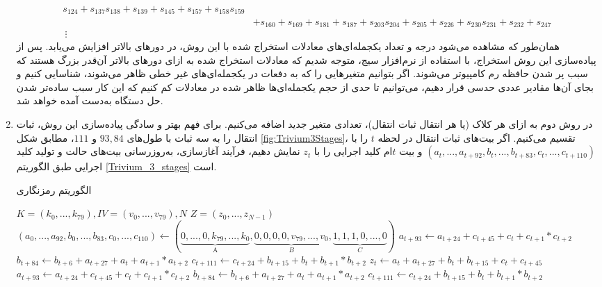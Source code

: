 \begin{enumerate}
\begin{align*}
	s_{124} + s_{137} s_{138} + s_{139} + s_{145} + s_{157} + s_{158}
	s_{159}\\
	&+ s_{160} + s_{169} + s_{181} + s_{187} + s_{203} s_{204} + s_{205} + s_{226} + s_{230} s_{231} + s_{232} + s_{247}\\
	\ \vdots
	\end{align*}
	همان‌طور که مشاهده می‌شود درجه و تعداد یکجمله‌ای‌های معادلات استخراج شده  با این روش، در دورهای بالاتر افزایش می‌یابد. پس از پیاده‌سازی این روش استخراج، با استفاده از نرم‌افزار سیج، متوجه شدیم که معادلات استخراج شده به ازای دورهای بالاتر آن‌قدر بزرگ هستند که سبب پر شدن حافظه رم کامپیوتر می‌شوند. اگر بتوانیم متغیرهایی را که  به دفعات  در یکجمله‌ای‌های غیر خطی ظاهر می‌شوند،  شناسایی کنیم و بجای آن‌ها مقادیر عددی حدسی قرار دهیم، می‌توانیم تا حدی از حجم یکجمله‌ای‌ها ظاهر شده در معادلات کم کنیم که این کار سبب ساده‌تر شدن حل دستگاه به‌دست آمده خواهد شد. 
	
	\item 
	در روش دوم به ازای هر کلاک (یا هر انتقال ثبات انتقال)، تعدادی متغیر جدید اضافه می‌کنیم. برای فهم بهتر و سادگی پیاده‌سازی این روش، ثبات انتقال 
	را به سه ثبات با طول‌های 
	$93, 84$
	و 
	$111$، 
	مطابق شکل 
	\ref{fig:Trivium3Stages}، 
	تقسیم می‌کنیم.  اگر بیت‌های ثبات انتقال در لحظه 
	$t$
	را با  
	$(a_{t},...,a_{t + 92}, b_{t},...,b_{t + 83}, c_{t},..., c_{t + 110})$
	و بیت 
	$t$ام
	کلید اجرایی را با 
	$z_{t}$
	نمایش دهیم، فرآیند آغازسازی، به‌روزرسانی بیت‌های حالت و تولید کلید اجرایی طبق  الگوریتم 
	\ref{Trivium_3_stages}  
	است.
\begin{algorithm}
\caption{الگوریتم رمزنگاری 
		}
\label{Trivium_3_stages}	
	\begin{latin}
		\begin{algorithmic}[]
				
			\REQUIRE  $K = (k_{0},...,k_{79}), IV = (v_{0},...,v_{79}), N$
			\ENSURE $Z = (z_{0},...,z_{N - 1})$
			\STATE $(a_{0},...,a_{92},b_{0},...,b_{83},c_{0},...,c_{110})\gets (\underbrace{0,...,0, k_{79},...,k_{0}}_\text{A},\underbrace{0,0,0,0,v_{79},...,v_{0}}_{B},\underbrace{1,1,1,0,...,0}_{C})$
			\STATE $a_{t + 93} \gets a_{t + 24} + c_{t + 45} + c_{t} + c_{t + 1}*c_{t + 2}$
			\STATE $b_{t + 84} \gets b_{t + 6} + a_{t + 27} + a_{t} + a_{t + 1}*a_{t + 2}$
			\STATE $c_{t + 111} \gets c_{t + 24} + b_{t + 15} + b_{t} + b_{t + 1}*b_{t + 2}$
			\ENDFOR
			\STATE $z_{t} \gets a_{t} + a_{t + 27} + b_{t} + b_{t + 15} + c_{t} + c_{t + 45}$
			\STATE $a_{t + 93} \gets a_{t + 24} + c_{t + 45} + c_{t} + c_{t + 1}*c_{t + 2}$
			\STATE $b_{t + 84} \gets b_{t + 6} + a_{t + 27} + a_{t} + a_{t + 1}*a_{t + 2}$
			\STATE $c_{t + 111} \gets c_{t + 24} + b_{t + 15} + b_{t} + b_{t + 1}*b_{t + 2}$		
			\ENDFOR
		\end{algorithmic}
	\end{latin}
\end{algorithm}
	

\end{enumerate}
